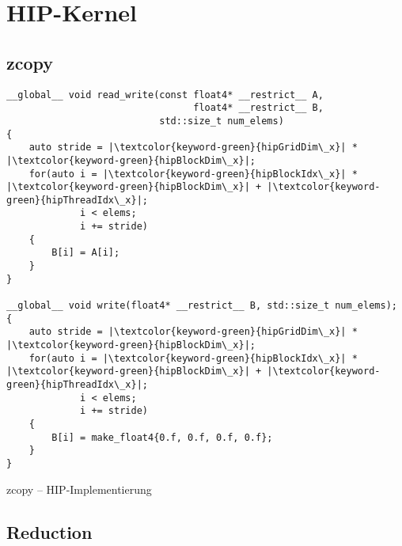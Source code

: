 \section{HIP-Kernel}

\subsection{zcopy}

\begin{code}
    \begin{verbatim}
__global__ void read_write(const float4* __restrict__ A,
                                 float4* __restrict__ B,
                           std::size_t num_elems)
{
    auto stride = |\textcolor{keyword-green}{hipGridDim\_x}| * |\textcolor{keyword-green}{hipBlockDim\_x}|;
    for(auto i = |\textcolor{keyword-green}{hipBlockIdx\_x}| * |\textcolor{keyword-green}{hipBlockDim\_x}| + |\textcolor{keyword-green}{hipThreadIdx\_x}|;
             i < elems;
             i += stride)
    {
        B[i] = A[i];
    }
}

__global__ void write(float4* __restrict__ B, std::size_t num_elems);
{
    auto stride = |\textcolor{keyword-green}{hipGridDim\_x}| * |\textcolor{keyword-green}{hipBlockDim\_x}|;
    for(auto i = |\textcolor{keyword-green}{hipBlockIdx\_x}| * |\textcolor{keyword-green}{hipBlockDim\_x}| + |\textcolor{keyword-green}{hipThreadIdx\_x}|;
             i < elems;
             i += stride)
    {
        B[i] = make_float4{0.f, 0.f, 0.f, 0.f};
    }
}
    \end{verbatim}
    \caption{zcopy -- HIP-Implementierung}
    \label{anhang:hip:zcopy}
\end{code}

\subsection{Reduction}

